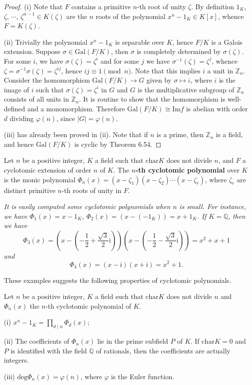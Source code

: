 \begin{proof}
(i) Note that $F$ contains a primitive $n$-th root of unity $\zeta$. By definition $1_K$, $\zeta$, $\cdots$, $\zeta^{n-1}\in K(\zeta)$ are the $n$ roots of the polynomial $x^n-1_K\in K[x]$, whence $F=K(\zeta)$.\par
(ii) Trivially the polynomial $x^n-1_K$ is separable over $K$, hence $F/K$ is a Galois extension. Suppose $\sigma\in\mathrm{Gal}(F/K)$, then $\sigma$ is completely determined by $\sigma(\zeta)$. For some $i$, we have $\sigma(\zeta)=\zeta^i$ and for some $j$ we have $\sigma^{-1}(\zeta)=\zeta^j$, whence $\zeta=\sigma^{-1}\sigma(\zeta)=\zeta^{ij}$, hence $ij\equiv 1\pmod{n}$. Note that this implies $i$ a unit in $\mathbb{Z}_n$. Consider the homomorphism $\mathrm{Gal}(F/K)\to G$ given by $\sigma\mapsto\overline{\iota}$, where $\overline{\iota}$ is the image of $i$ such that $\sigma(\zeta)=\zeta^i$ in $G$ and $G$ is the multiplicative subgroup of $\mathbb{Z}_n$ consists of all units in $\mathbb{Z}_n$. It is routine to show that the homomorphism is well-defined and a monomorphism. Therefore $\mathrm{Gal}(F/K)\cong\mathrm{Im}f$ is abelian with order $d$ dividing $\varphi(n)$, since $|G|=\varphi(n)$.\par
(iii) has already been proved in (ii). Note that if $n$ is a prime, then $\mathbb{Z}_n$ is a field, and hence $\mathrm{Gal}(F/K)$ is cyclic by Theorem 6.54.
\end{proof}
Let $n$ be a positive integer, $K$ a field such that $\mathrm{char}K$ does not divide $n$, and $F$ a cyclotomic extension of order $n$ of $K$. The \textbf{$n$-th cyclotomic polynomial} over $K$ is the monic polynomial $\Phi_n(x)=(x-\zeta_1)(x-\zeta_2)\cdots(x-\zeta_r)$, where $\zeta_r$ are distinct primitive $n$-th roots of unity in $F$.
\begin{example}\em
It is easily computed some cyclotomic polynomials when $n$ is small. For instance, we have $\Phi_1(x)=x-1_K$, $\Phi_2(x)=(x-(-1_K))=x+1_K$. If $K=\mathbb{Q}$, then we have 
$$
\Phi _3\left( x \right) =\left( x-\left( -\frac{1}{2}+\frac{\sqrt{3}}{2}\mathrm{i} \right) \right) \left( x-\left( -\frac{1}{2}-\frac{\sqrt{3}}{2}\mathrm{i} \right) \right) =x^2+x+1
$$
and 
$$
\Phi _4\left( x \right) =\left( x-\mathrm{i} \right) \left( x+\mathrm{i} \right) =x^2+1.
$$
\end{example}
These examples suggests the following properties of cyclotomic polynomials.
\begin{proposition}
Let $n$ be a positive integer, $K$ a field such that $\mathrm{char}K$ does not divide $n$ and $\Phi_n(x)$ the $n$-th cyclotomic polynomial of $K$.\par
(i) $x^n-1_K=\prod_{d\mid n}\Phi_d(x)$;\par
(ii) The coefficients of $\Phi_n(x)$ lie in the prime subfield $P$ of $K$. If $\mathrm{char}K=0$ and $P$ is identified with the field $\mathbb{Q}$ of rationals, then the coefficients are actually integers.\par
(iii) $\mathrm{deg}\Phi_n(x)=\varphi(n)$, where $\varphi$ is the Euler function.
\end{proposition}

